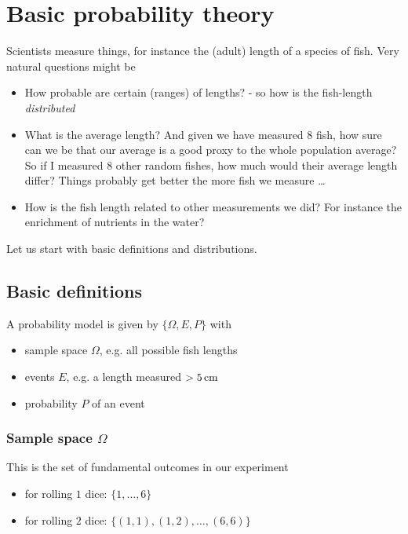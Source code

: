 \section{Basic probability theory}
\thispagestyle{plain}

Scientists measure things, for instance the (adult) length of a species of fish.
Very natural questions might be
\begin{itemize}
    \item How probable are certain (ranges) of lengths? - so how is the fish-length \textit{distributed}
    \item What is the average length? And given we have measured $8$ fish, how sure can we be that our average
    is a good proxy to the whole population average? So if I measured $8$ other random fishes, how much would their
    average length differ? Things probably get better the more fish we measure \dots
    \item How is the fish length related to other measurements we did? For instance the enrichment of nutrients in the water?
\end{itemize}

Let us start with basic definitions and distributions.

\subsection{Basic definitions}
A probability model is given by $\{\Omega,E,P\}$ with
\begin{itemize}
    \item sample space $\Omega$, e.g. all possible fish lengths
    \item events $E$, e.g. a length measured $> 5\operatorname{cm}$
    \item probability $P$ of an event
\end{itemize}

\subsubsection{Sample space $\Omega$}
This is the set of fundamental outcomes in our experiment
\begin{itemize}
    \item for rolling $1$ dice: $\{1,\dots,6\}$
    \item for rolling $2$ dice: $\{(1,1),(1,2),\dots,(6,6)\}$
\end{itemize}

